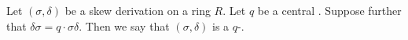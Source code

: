 \documentclass{article}
\begin{document}
Let $(\sigma, \delta)$ be a skew derivation on a ring $R$.
Let $q$ be a central .
Suppose further that $\delta\sigma = q \cdot \sigma\delta$.
Then we say that $(\sigma, \delta)$ 
is a $q$-.
\end{document}
